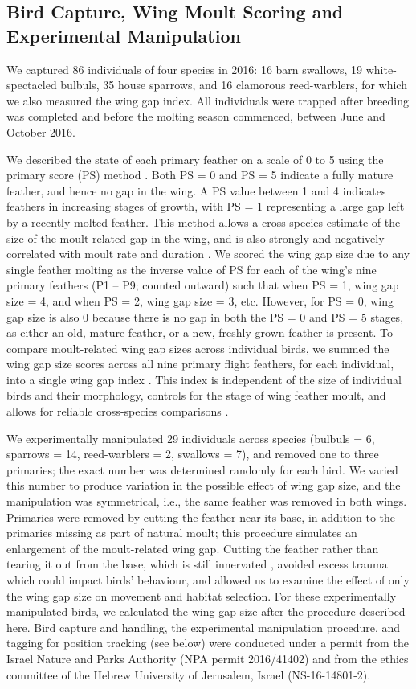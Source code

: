 \subsection*{Bird Capture, Wing Moult Scoring and Experimental Manipulation}

We captured 86 individuals of four species in 2016: 16 barn swallows, 19 white-spectacled bulbuls, 35 house sparrows, and 16 clamorous reed-warblers, for which we also measured the wing gap index.
All individuals were trapped after breeding was completed and before the molting season commenced, between June and October 2016.

We described the state of each primary feather on a scale of 0 to 5 using the primary score (PS) method \citep{ginn1983}.
Both PS = 0 and PS = 5 indicate a fully mature feather, and hence no gap in the wing.
A PS value between 1 and 4 indicates feathers in increasing stages of growth, with PS = 1 representing a large gap left by a recently molted feather.
This method allows a cross-species estimate of the size of the moult-related gap in the wing, and is also strongly and negatively correlated with moult rate and duration \citep{rohwer2009}.
We scored the wing gap size due to any single feather molting as the inverse value of PS for each of the wing's nine primary feathers (P1 -- P9; counted outward) such that when PS = 1, wing gap size = 4, and when PS = 2, wing gap size = 3, etc.
However, for PS = 0, wing gap size is also 0 because there is no gap in both the PS = 0 and PS = 5 stages, as either an old, mature feather, or a new, freshly grown feather is present.
To compare moult-related wing gap sizes across individual birds, we summed the wing gap size scores across all nine primary flight feathers, for each individual, into a single wing gap index \citep{kiat2016}.
This index is independent of the size of individual birds and their morphology, controls for the stage of wing feather moult, and allows for reliable cross-species comparisons \citep{bensch1993,kiat2016}.

We experimentally manipulated 29 individuals across species {(bulbuls = 6, sparrows = 14, reed-warblers = 2, swallows = 7)}, and removed one to three primaries; the exact number was determined randomly for each bird.
We varied this number to produce variation in the possible effect of wing gap size, and the manipulation was symmetrical, i.e., the same feather was removed in both wings.
Primaries were removed by cutting the feather near its base, in addition to the primaries missing as part of natural moult; this procedure simulates an enlargement of the moult-related wing gap.
Cutting the feather rather than tearing it out from the base, which is still innervated \cite{jenni2020}, avoided excess trauma which could impact birds' behaviour, and allowed us to examine the effect of only the wing gap size on movement and habitat selection.
For these experimentally manipulated birds, we calculated the wing gap size after the procedure described here.
Bird capture and handling, the experimental manipulation procedure, and tagging for position tracking (see below) were conducted under a permit from the Israel Nature and Parks Authority (NPA permit 2016/41402) and from the ethics committee of the Hebrew University of Jerusalem, Israel (NS-16-14801-2).

